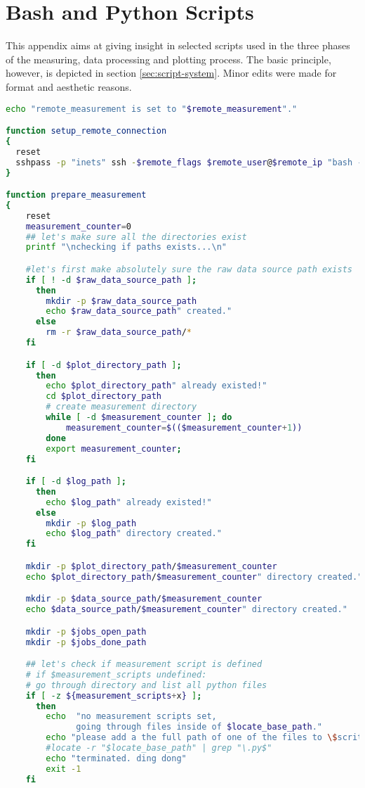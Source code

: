 \chapter{Bash and Python Scripts}

This appendix aims at giving insight in selected scripts used in the three phases of the measuring, data processing and plotting process. The basic principle, however, is depicted in section \ref{sec:script-system}. Minor edits were made for format and aesthetic reasons.

\begin{lstlisting}[language=Bash,caption=measure.sh]
echo "remote_measurement is set to "$remote_measurement"."

function setup_remote_connection
{
  reset
  sshpass -p "inets" ssh -$remote_flags $remote_user@$remote_ip "bash -s" < remote_measurement_$link.sh
}

function prepare_measurement
{
    reset
    measurement_counter=0
    ## let's make sure all the directories exist
    printf "\nchecking if paths exists...\n"

    #let's first make absolutely sure the raw data source path exists
    if [ ! -d $raw_data_source_path ];
      then
        mkdir -p $raw_data_source_path
        echo $raw_data_source_path" created."
      else
        rm -r $raw_data_source_path/*
    fi

    if [ -d $plot_directory_path ];
      then
        echo $plot_directory_path" already existed!"
        cd $plot_directory_path
        # create measurement directory
        while [ -d $measurement_counter ]; do
            measurement_counter=$(($measurement_counter+1))
        done
        export measurement_counter;
    fi

    if [ -d $log_path ];
      then
        echo $log_path" already existed!"
      else
        mkdir -p $log_path
        echo $log_path" directory created."
    fi

    mkdir -p $plot_directory_path/$measurement_counter
    echo $plot_directory_path/$measurement_counter" directory created."

    mkdir -p $data_source_path/$measurement_counter
    echo $data_source_path/$measurement_counter" directory created."

    mkdir -p $jobs_open_path
    mkdir -p $jobs_done_path

    ## let's check if measurement script is defined
    # if $measurement_scripts undefined:
    # go through directory and list all python files
    if [ -z ${measurement_scripts+x} ];
      then
        echo  "no measurement scripts set,
              going through files inside of $locate_base_path."
        echo "please add a the full path of one of the files to \$scritps."
        #locate -r "$locate_base_path" | grep "\.py$"
        echo "terminated. ding dong"
        exit -1
    fi


\end{lstlisting}
